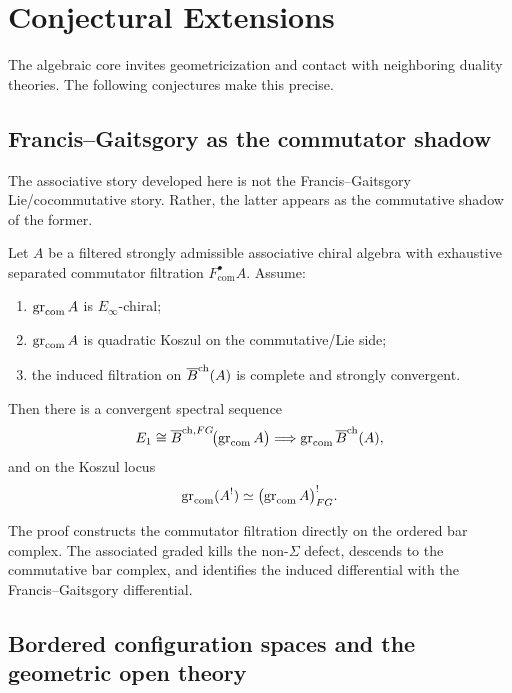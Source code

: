 \section{Conjectural Extensions}
\label{sec:conjectures}

The algebraic core invites geometricization and contact with
neighboring duality theories. The following conjectures make this precise.

\subsection{Francis--Gaitsgory as the commutator shadow}

The associative story developed here is not the Francis--Gaitsgory Lie/cocommutative story.
Rather, the latter appears as the commutative shadow of the former.

\begin{theorem}
\ClaimStatusProvedElsewhere
\label{thm:FG-shadow-vol2}
Let $A$ be a filtered strongly admissible associative chiral algebra with exhaustive separated
commutator filtration $F_{\mathrm{com}}^\bullet A$. Assume:
\begin{enumerate}[label=(\alph*)]
\item $\operatorname{gr}_{\mathrm{com}}A$ is $E_\infty$-chiral;
\item $\operatorname{gr}_{\mathrm{com}}A$ is quadratic Koszul on the commutative/Lie side;
\item the induced filtration on $\overline{B}^{\mathrm{ch}}(A)$ is complete and strongly convergent.
\end{enumerate}
Then there is a convergent spectral sequence
\[
E_1\cong \overline{B}^{\mathrm{ch},FG}\!\bigl(\operatorname{gr}_{\mathrm{com}}A\bigr)
\Longrightarrow
\operatorname{gr}_{\mathrm{com}}\overline{B}^{\mathrm{ch}}(A),
\]
and on the Koszul locus
\[
\operatorname{gr}_{\mathrm{com}}(A^!)\simeq \bigl(\operatorname{gr}_{\mathrm{com}}A\bigr)^!_{FG}.
\]
\end{theorem}

\begin{remark}
The proof constructs the commutator filtration directly on the ordered
bar complex. The associated graded kills the non-$\Sigma$ defect,
descends to the commutative bar complex, and identifies the induced
differential with the Francis--Gaitsgory differential.
\end{remark}

\subsection{Bordered configuration spaces and the geometric open theory}

